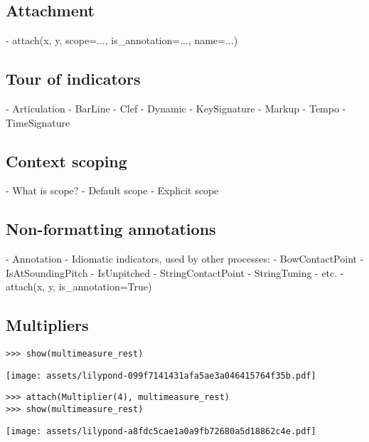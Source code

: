 \subsection{Attachment}

\begin{markdown}
-   attach(x, y, scope=..., is_annotation=..., name=...)
\end{markdown}

\subsection{Tour of indicators}

\begin{markdown}
-   Articulation
-   BarLine
-   Clef
-   Dynamic
-   KeySignature
-   Markup
-   Tempo
-   TimeSignature
\end{markdown}

\subsection{Context scoping}

\begin{markdown}
-   What is scope?
-   Default scope
-   Explicit scope
\end{markdown}

\subsection{Non-formatting annotations}

\begin{markdown}
-   Annotation
-   Idiomatic indicators, used by other processes:
    -   BowContactPoint
    -   IsAtSoundingPitch
    -   IsUnpitched
    -   StringContactPoint
    -   StringTuning
    -   etc.
-   attach(x, y, is_annotation=True)
\end{markdown}

\subsection{Multipliers}

\begin{comment}
<abjad>
show(multimeasure_rest)
attach(Multiplier(4), multimeasure_rest)
show(multimeasure_rest)
</abjad>
\end{comment}

\begin{abjadbookoutput}
\begin{singlespacing}
\vspace{-0.5\baselineskip}
\begin{lstlisting}
>>> show(multimeasure_rest)
\end{lstlisting}
\noindent\texttt{[image: assets/lilypond-099f7141431afa5ae3a046415764f35b.pdf]}
\begin{lstlisting}
>>> attach(Multiplier(4), multimeasure_rest)
>>> show(multimeasure_rest)
\end{lstlisting}
\noindent\texttt{[image: assets/lilypond-a8fdc5cae1a0a9fb72680a5d18862c4e.pdf]}
\end{singlespacing}
\end{abjadbookoutput}

